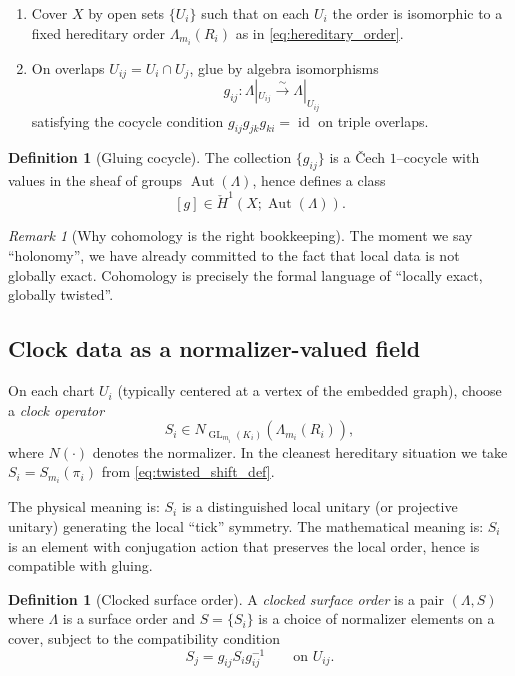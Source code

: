 \documentclass[11pt,oneside]{amsbook}
\numberwithin{equation}{section}
\theoremstyle{plain}
\theoremstyle{definition}
\newtheorem{definition}[theorem]{Definition}
\theoremstyle{remark}
\newtheorem{remark}[theorem]{Remark}
\DeclareMathOperator{\id}{\mathrm{id}}
\DeclareMathOperator{\Aut}{\mathrm{Aut}}
\DeclareMathOperator{\GL}{\mathrm{GL}}
\begin{document}
\begin{enumerate}
\item Cover $X$ by open sets $\{U_i\}$ such that on each $U_i$ the order is isomorphic to a fixed hereditary order $\Lambda_{m_i}(R_i)$ as in \eqref{eq:hereditary_order}.
\item On overlaps $U_{ij}=U_i\cap U_j$, glue by algebra isomorphisms
\[
g_{ij}:\Lambda|_{U_{ij}}\xrightarrow{\sim}\Lambda|_{U_{ij}}
\]
satisfying the cocycle condition $g_{ij}g_{jk}g_{ki}=\id$ on triple overlaps.
\end{enumerate}

\begin{definition}[Gluing cocycle]
The collection $\{g_{ij}\}$ is a \v{C}ech $1$--cocycle with values in the sheaf of groups $\Aut(\Lambda)$, hence defines a class
\[
[g]\in \check{H}^1(X;\Aut(\Lambda)).
\]
\end{definition}

\begin{remark}[Why cohomology is the right bookkeeping]
The moment we say ``holonomy'', we have already committed to the fact that local data is not globally exact.
Cohomology is precisely the formal language of ``locally exact, globally twisted''.
\end{remark}

\subsection{Clock data as a normalizer-valued field}
\label{sec:clock_field}

On each chart $U_i$ (typically centered at a vertex of the embedded graph), choose a \emph{clock operator}
\[
S_i\in N_{\GL_{m_i}(K_i)}(\Lambda_{m_i}(R_i)),
\]
where $N(\cdot)$ denotes the normalizer.
In the cleanest hereditary situation we take $S_i=S_{m_i}(\pi_i)$ from \eqref{eq:twisted_shift_def}.

The physical meaning is: $S_i$ is a distinguished local unitary (or projective unitary) generating the local ``tick'' symmetry.
The mathematical meaning is: $S_i$ is an element with conjugation action that preserves the local order, hence is compatible with gluing.

\begin{definition}[Clocked surface order]
A \emph{clocked surface order} is a pair $(\Lambda,S)$ where $\Lambda$ is a surface order and $S=\{S_i\}$ is a choice of normalizer elements on a cover, subject to the compatibility condition
\[
S_j = g_{ij} S_i g_{ij}^{-1}\qquad \text{on }U_{ij}.
\]
\end{definition}
\end{document}
